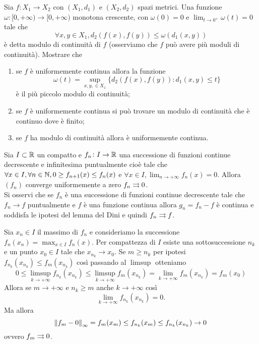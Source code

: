 \begin{es}
  Sia $ f \colon X_1 \to X_2 $ con $ (X_1, d_1) $ e $ (X_2, d_2) $ spazi metrici. Una funzione $ \omega \colon [0, +\infty) \to [0, +\infty) $ monotona crescente, con $ \omega(0) = 0 $ e $ \lim_{t \to 0^{+}} \omega(t) = 0 $ tale che \[\forall x, y \in X_1, d_2(f(x), f(y)) \leq \omega(d_1(x, y))\] è detta modulo di continuità di $ f $ (osserviamo che $ f $ può avere più moduli di continuità). Mostrare che
  \begin{enumerate}
  \item se $ f $ è uniformemente continua allora la funzione \[\omega(t) = \sup_{x, y, \in X_1} \{d_2(f(x), f(y)) : d_1(x, y) \leq t\}\] è il più piccolo modulo di continuità;
  \item se $ f $ è uniformemente continua si può trovare un modulo di continuità che è continuo dove è finito;
  \item se $ f $ ha modulo di continuità allora è uniformemente continua.
  \end{enumerate}
\end{es}
%


\begin{es}
  Sia $ I \subset \mathbb{R} $ un compatto e $ f_n \colon I \to \mathbb{R} $ una successione di funzioni continue decrescente e infinitesima puntualmente cioè tale che $ \forall x \in I, \forall n \in \mathbb{N}, 0 \geq f_{n + 1}(x) \leq f_n(x) $ e $ \forall x \in I, \lim_{n \to +\infty} f_n(x) = 0 $. Allora $ (f_n) $ converge uniformemente a zero $ f_n \rightrightarrows 0 $. \\
  Si osservi che se $ f_n $ è una successione di funzioni continue decrescente tale che $ f_n \to f $ puntualmente e $ f $ è una funzione continua allora $ g_n = f_n - f $ è continua e soddisfa le ipotesi del lemma del Dini e quindi $ f_n \rightrightarrows f $.
\end{es}
%
Sia $ x_n \in I $ il massimo di $ f_n $ e consideriamo la successione $ f_n(x_n) = \max_{x \in I} f_n(x) $. Per compattezza di $ I $ esiste una sottosuccessione $ n_k $ e un punto $ x_0 \in I $ tale che $ x_{n_k} \to x_0 $. Se $ m \geq n_k $ per ipotesi $ f_{n_k}(x_{n_k}) \leq f_m(x_{n_k}) $ così passando al $ \limsup $ otteniamo
\begin{equation*}
  0 \leq \limsup_{k \to +\infty} f_{n_k}(x_{n_k}) \leq \limsup_{k \to +\infty} f_{m}(x_{n_k}) = \lim_{k \to +\infty} f_m(x_{n_k}) = f_m(x_0)
\end{equation*}
Allora se $ m \to +\infty $ e $ n_k \geq m $ anche $ k \to +\infty $ così \[\lim_{k \to +\infty} f_{n_k}(x_{n_k}) = 0.\] Ma allora
\begin{equation*}
  \norm{f_m - 0}_{\infty} = f_m(x_m) \leq f_{n_k}(x_m) \leq f_{n_k}(x_{n_k}) \to 0
\end{equation*}
ovvero $ f_m \rightrightarrows 0 $.

